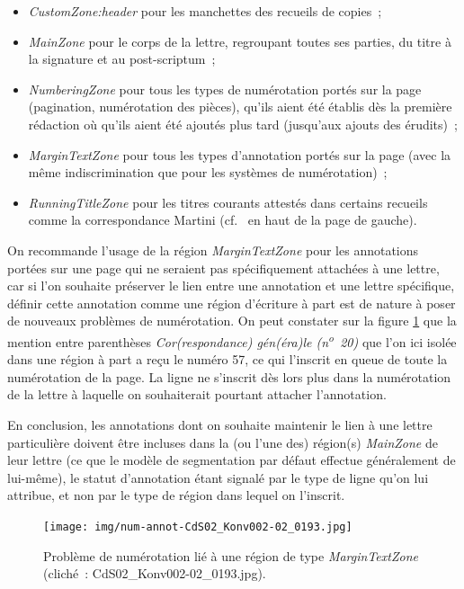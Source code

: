 \documentclass[a4paper,12pt,twoside]{book}
\begin{document}
				\begin{itemize}
					\item \textit{CustomZone:header} pour les manchettes des recueils de copies~;
					\item \textit{MainZone} pour le corps de la lettre, regroupant toutes ses parties, du titre à la signature et au post-scriptum~;
					\item \textit{NumberingZone} pour tous les types de numérotation portés sur la page (pagination, numérotation des pièces), qu'ils aient été établis dès la première rédaction où qu'ils aient été ajoutés plus tard (jusqu'aux ajouts des érudits)~;
					\item \textit{MarginTextZone} pour tous les types d'annotation portés sur la page (avec la même indiscrimination que pour les systèmes de numérotation)~;
					\item \textit{RunningTitleZone} pour les titres courants attestés dans certains recueils comme la correspondance Martini (cf.~\cite{CdS19054056} en haut de la page de gauche).
				\end{itemize}
				
				On recommande l'usage de la région \textit{MarginTextZone} pour les annotations portées sur une page qui ne seraient pas spécifiquement attachées à une lettre, car si l'on souhaite préserver le lien entre une annotation et une lettre spécifique, définir cette annotation comme une région d'écriture à part est de nature à poser de nouveaux problèmes de numérotation. On peut constater sur la figure \ref{num-annot-193} que la mention entre parenthèses \textit{Cor(respondance) gén(éra)le (n\textsuperscript{o}~20)} que l'on ici isolée dans une région à part a reçu le numéro 57, ce qui l'inscrit en queue de toute la numérotation de la page. La ligne ne s'inscrit dès lors plus dans la numérotation de la lettre à laquelle on souhaiterait pourtant attacher l'annotation.
				
				En conclusion, les annotations dont on souhaite maintenir le lien à une lettre particulière doivent être incluses dans la (ou l'une des) région(s) \textit{MainZone} de leur lettre (ce que le modèle de segmentation par défaut effectue généralement de lui-même), le statut d'annotation étant signalé par le type de ligne qu'on lui attribue, et non par le type de région dans lequel on l'inscrit.
				
				\begin{figure}[!h]
					\centering
					\texttt{[image: img/num-annot-CdS02\_Konv002-02\_0193.jpg]}
					\caption{Problème de numérotation lié à une région de type \textit{MarginTextZone} (cliché~: CdS02\_Konv002-02\_0193.jpg).}
					\label{num-annot-193}
				\end{figure}
				
\end{document}

